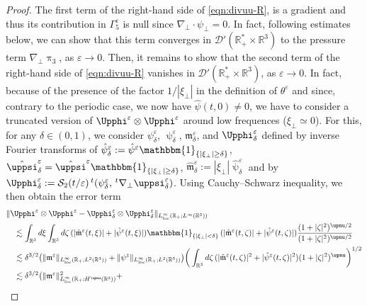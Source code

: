 \documentclass[11pt,reqno]{amsart}
\def \R{{\mathbb{R}}}
\begin{document}
\begin{proof}
  The first term of the right-hand side of \eqref{eqn:divuu-R}, is a gradient and thus its contribution in $\Gamma_5^\varepsilon$ is null since $\nabla_\perp \cdot \psi_\perp=0$. In fact, following estimates below, we can show that this term converges in $\mathcal D'(\R_+^* \times \R^3)$ to the pressure term $\nabla_\perp \uppi_3$, as $\varepsilon \rightarrow 0$. Then, it remains to show that  the second term of the right-hand side of \eqref{eqn:divuu-R} vanishes in $\mathcal D'(\R_+^*\times \R^3)$, as  $\varepsilon \rightarrow 0$. In fact, because of the presence of the factor $1/|\xi_\perp|$ in the definition of $\theta^\varepsilon$ and since, contrary to the periodic case, we now have $\hat \psi (t,0) \neq 0$, we have to consider a truncated version of $\Upphi^\varepsilon\otimes \Upphi^\varepsilon$ around low frequences ($\xi_\perp \simeq 0$). For this, for any $\delta \in (0,1)$, we consider $\psi_\delta^\varepsilon$,  $\uppsi_\delta^\varepsilon$, $\mathfrak  m_\delta^\varepsilon$, and $\Upphi_\delta^\varepsilon$ defined by inverse Fourier transforms of $\hat \psi_\delta^\varepsilon:=\hat \psi^\varepsilon \mathbbm{1}_{\{|\xi_\perp|\geq \delta\}}$, $ \hat \uppsi_\delta^\varepsilon=\hat \uppsi^\varepsilon \mathbbm{1}_{\{|\xi_\perp|\geq \delta\}}$, $\hat{\mathfrak  m}_\delta^\varepsilon:=|\xi_\perp| \hat\uppsi_\delta^\varepsilon$ and by $\Upphi_\delta^\varepsilon:=\mathcal S_2(t/\varepsilon)\,{}^t(\psi_\delta^\varepsilon,\,{}^t\nabla_\perp \uppsi_\delta^\varepsilon)$. Using Cauchy--Schwarz inequality, we then obtain the error term
  \begin{align*}
    &\| \Upphi^\varepsilon\otimes \Upphi^\varepsilon - \Upphi_\delta^\varepsilon \otimes \Upphi_\delta^\varepsilon\|_{L_{\rm loc}^\infty(\R_+;L^\infty(\R^3))} \\
    & \quad  \lesssim \int_{\R^3}d\xi \int_{\R^3}d\zeta\, (|\hat{\mathfrak  m}^\varepsilon(t,\xi)| + |\hat \psi^\varepsilon(t,\xi)|)
    \mathbbm{1}_{\{|\xi_\perp|<\delta\}} \, (|\hat{\mathfrak  m}^\varepsilon(t,\zeta)| + |\hat \psi^\varepsilon(t,\zeta)|) \frac{(1+|\zeta|^2)^{\upnu/2}}{(1+|\zeta|^2)^{\upnu/2}}\\
    & \quad  \lesssim \delta^{3/2}\big(\| {\mathfrak  m}^\varepsilon\|_{L_{\rm loc}^\infty(\R_+;L^2(\R^3))} +
    \|\psi^\varepsilon\|_{L_{\rm loc}^\infty(\R_+;L^2(\R^3))}\big)  \bigg(\int_{\R^3}d\zeta\,
    (|\hat{\mathfrak  m}^\varepsilon(t,\zeta)|^2 + |\hat \psi^\varepsilon(t,\zeta)|^2) (1+|\zeta|^2)^\upnu\bigg)^{1/2} \\
    & \quad  \lesssim \delta^{3/2} \big(\| {\mathfrak  m}^\varepsilon \|_{L_{\rm loc}^\infty(\R_+;H^\upnu(\R^3))}^2 +

\end{align*}
\end{proof}
\end{document}

